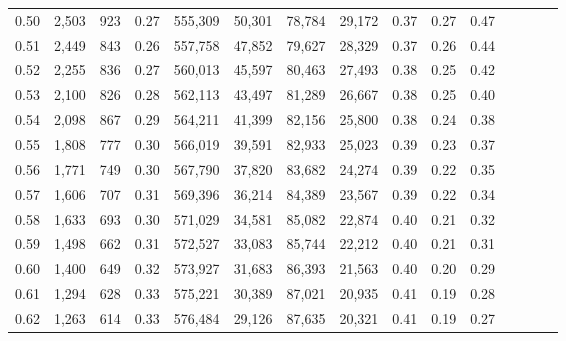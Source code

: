 \begin{tabular}{rrrcrrrrrrrrrrr}
0.50 &   2,503 &    923 &                                       0.27 &  555,309 &   50,301 &   78,784 &   29,172 &  0.37 &  0.27 &                         0.47 \\
0.51 &   2,449 &    843 &                                       0.26 &  557,758 &   47,852 &   79,627 &   28,329 &  0.37 &  0.26 &                         0.44 \\
0.52 &   2,255 &    836 &                                       0.27 &  560,013 &   45,597 &   80,463 &   27,493 &  0.38 &  0.25 &                         0.42 \\
0.53 &   2,100 &    826 &                                       0.28 &  562,113 &   43,497 &   81,289 &   26,667 &  0.38 &  0.25 &                         0.40 \\
0.54 &   2,098 &    867 &                                       0.29 &  564,211 &   41,399 &   82,156 &   25,800 &  0.38 &  0.24 &                         0.38 \\
0.55 &   1,808 &    777 &                                       0.30 &  566,019 &   39,591 &   82,933 &   25,023 &  0.39 &  0.23 &                         0.37 \\
0.56 &   1,771 &    749 &                                       0.30 &  567,790 &   37,820 &   83,682 &   24,274 &  0.39 &  0.22 &                         0.35 \\
0.57 &   1,606 &    707 &                                       0.31 &  569,396 &   36,214 &   84,389 &   23,567 &  0.39 &  0.22 &                         0.34 \\
0.58 &   1,633 &    693 &                                       0.30 &  571,029 &   34,581 &   85,082 &   22,874 &  0.40 &  0.21 &                         0.32 \\
0.59 &   1,498 &    662 &                                       0.31 &  572,527 &   33,083 &   85,744 &   22,212 &  0.40 &  0.21 &                         0.31 \\
0.60 &   1,400 &    649 &                                       0.32 &  573,927 &   31,683 &   86,393 &   21,563 &  0.40 &  0.20 &                         0.29 \\
0.61 &   1,294 &    628 &                                       0.33 &  575,221 &   30,389 &   87,021 &   20,935 &  0.41 &  0.19 &                         0.28 \\
0.62 &   1,263 &    614 &                                       0.33 &  576,484 &   29,126 &   87,635 &   20,321 &  0.41 &  0.19 &                         0.27 \\

\end{tabular}
